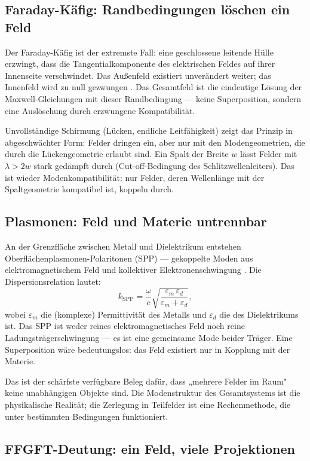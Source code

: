 \subsection*{Faraday-Käfig: Randbedingungen löschen ein Feld}

Der Faraday-Käfig ist der extremste Fall: eine geschlossene leitende
Hülle erzwingt, dass die Tangentialkomponente des elektrischen Feldes
auf ihrer Innenseite verschwindet. Das Außenfeld existiert unverändert
weiter; das Innenfeld wird zu null gezwungen \EM. Das Gesamtfeld ist
die eindeutige Lösung der Maxwell-Gleichungen mit dieser Randbedingung
--- keine Superposition, sondern eine Auslöschung durch erzwungene
Kompatibilität.

Unvollständige Schirmung (Lücken, endliche Leitfähigkeit) zeigt das
Prinzip in abgeschwächter Form: Felder dringen ein, aber nur mit den
Modengeometrien, die durch die Lückengeometrie erlaubt sind. Ein
Spalt der Breite $w$ lässt Felder mit $\lambda > 2w$ stark gedämpft
durch (Cut-off-Bedingung des Schlitzwellenleiters). Das ist wieder
Modenkompatibilität: nur Felder, deren Wellenlänge mit der
Spaltgeometrie kompatibel ist, koppeln durch.

\subsection*{Plasmonen: Feld und Materie untrennbar}

An der Grenzfläche zwischen Metall und Dielektrikum entstehen
Oberflächenplasmonen-Polaritonen (SPP) --- gekoppelte Moden aus
elektromagnetischem Feld und kollektiver Elektronenschwingung \cite{Maier2007}.
Die Dispersionsrelation lautet:
\[
  k_\mathrm{SPP} = \frac{\omega}{c}\sqrt{\frac{\varepsilon_m\,\varepsilon_d}
    {\varepsilon_m + \varepsilon_d}},
\]
wobei $\varepsilon_m$ die (komplexe) Permittivität des Metalls und
$\varepsilon_d$ die des Dielektrikums ist. Das SPP ist weder reines
elektromagnetisches Feld noch reine La\-dungs\-trä\-ger\-schwin\-gung --- es ist
eine gemeinsame Mode beider Träger. Eine Superposition wäre
bedeutungslos: das Feld existiert nur in Kopplung mit der Materie.

Das ist der schärfste verfügbare Beleg dafür, dass „mehrere Felder
im Raum" keine unabhängigen Objekte sind. Die Modenstruktur des
Gesamtsystems ist die physikalische Realität; die Zerlegung in
Teilfelder ist eine Rechenmethode, die unter bestimmten Bedingungen
funktioniert.

\subsection*{FFGFT-Deutung: ein Feld, viele Projektionen}


